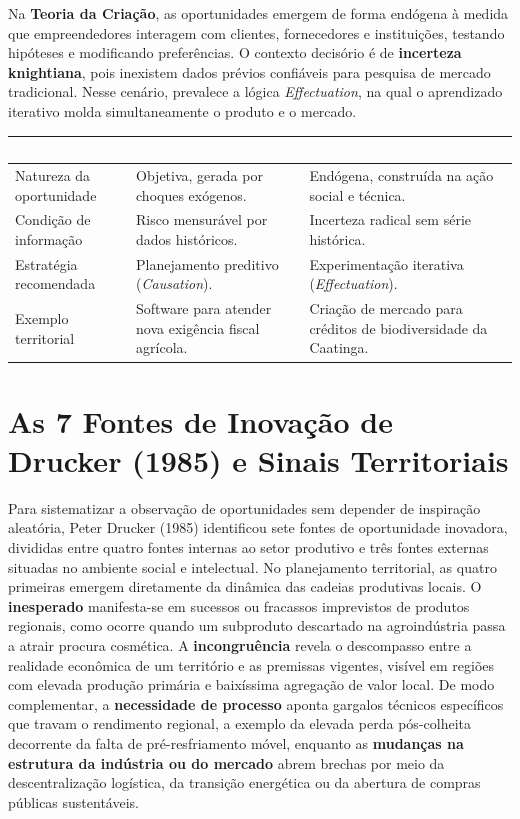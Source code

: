 Na \textbf{Teoria da Criação}, as oportunidades emergem de forma endógena à medida que empreendedores interagem com clientes, fornecedores e instituições, testando hipóteses e modificando preferências. O contexto decisório é de \textbf{incerteza knightiana}, pois inexistem dados prévios confiáveis para pesquisa de mercado tradicional. Nesse cenário, prevalece a lógica \textit{Effectuation}, na qual o aprendizado iterativo molda simultaneamente o produto e o mercado.

\begin{center}
\renewcommand{\arraystretch}{1.22}
\small
\begin{tabularx}{\textwidth}{@{}l >{\raggedright\arraybackslash}X >{\raggedright\arraybackslash}X@{}}
  \toprule
  \rowcolor{etIndigo}
  \textcolor{white}{\bfseries Critério} & \textcolor{white}{\bfseries Teoria da Descoberta} & \textcolor{white}{\bfseries Teoria da Criação} \\
  \midrule
  Natureza da oportunidade & Objetiva, gerada por choques exógenos. & Endógena, construída na ação social e técnica. \\
  \rowcolor{bgGray}
  Condição de informação & Risco mensurável por dados históricos. & Incerteza radical sem série histórica. \\
  Estratégia recomendada & Planejamento preditivo (\textit{Causation}). & Experimentação iterativa (\textit{Effectuation}). \\
  \rowcolor{bgGray}
  Exemplo territorial & Software para atender nova exigência fiscal agrícola. & Criação de mercado para créditos de biodiversidade da Caatinga. \\
  \bottomrule
\end{tabularx}
\end{center}

\section{As 7 Fontes de Inovação de Drucker (1985) e Sinais Territoriais}

Para sistematizar a observação de oportunidades sem depender de inspiração aleatória, Peter Drucker (1985) identificou sete fontes de oportunidade inovadora, divididas entre quatro fontes internas ao setor produtivo e três fontes externas situadas no ambiente social e intelectual. No planejamento territorial, as quatro primeiras emergem diretamente da dinâmica das cadeias produtivas locais. O \textbf{inesperado} manifesta-se em sucessos ou fracassos imprevistos de produtos regionais, como ocorre quando um subproduto descartado na agroindústria passa a atrair procura cosmética. A \textbf{incongruência} revela o descompasso entre a realidade econômica de um território e as premissas vigentes, visível em regiões com elevada produção primária e baixíssima agregação de valor local. De modo complementar, a \textbf{necessidade de processo} aponta gargalos técnicos específicos que travam o rendimento regional, a exemplo da elevada perda pós-colheita decorrente da falta de pré-resfriamento móvel, enquanto as \textbf{mudanças na estrutura da indústria ou do mercado} abrem brechas por meio da descentralização logística, da transição energética ou da abertura de compras públicas sustentáveis.


